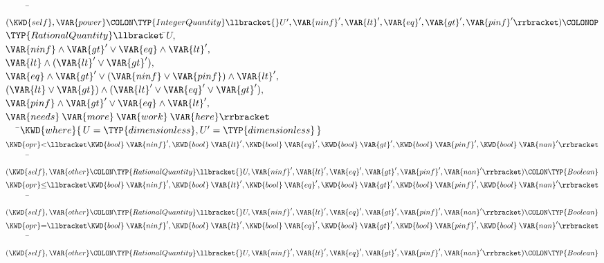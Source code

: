 \begin{Fortress}
{\tt~~~~~}\pushtabs\=\+\(       (\KWD{self}, \VAR{power}\COLON \TYP{IntegerQuantity}\llbracket{}U',\VAR{ninf}',\VAR{lt}',\VAR{eq}',\VAR{gt}',\VAR{pinf}'\rrbracket)\COLONOP\)\\
\(       \TYP{RationalQuantity}\llbracket\,\null\)\pushtabs\=\+\(U,\)\\
\(                         \VAR{ninf} \wedge \VAR{gt}' \vee \VAR{eq} \wedge \VAR{lt}',\)\\
\(                         \VAR{lt} \wedge (\VAR{lt}' \vee \VAR{gt}'),\)\\
\(                         \VAR{eq} \wedge \VAR{gt}' \vee (\VAR{ninf} \vee \VAR{pinf}) \wedge \VAR{lt}',\)\\
\(                         (\VAR{lt} \vee \VAR{gt}) \wedge (\VAR{lt}' \vee \VAR{eq}' \vee \VAR{gt}'),\)\\
\(                         \VAR{pinf} \wedge \VAR{gt}' \vee \VAR{eq} \wedge \VAR{lt}',\)\\
\(                         \VAR{needs}\:\VAR{more}\:\VAR{work}\:\VAR{here}\rrbracket\)\-\-\\\poptabs\poptabs
{\tt~~~}\pushtabs\=\+\(     \KWD{where} \{\,U = \mathbin{\TYP{dimensionless}}, U' = \mathbin{\TYP{dimensionless}}\,\}\)\-\\\poptabs
\(  \KWD{opr} \mathord{<}\llbracket\KWD{bool}\:\VAR{ninf}', \KWD{bool}\:\VAR{lt}', \KWD{bool}\:\VAR{eq}', \KWD{bool}\:\VAR{gt}', \KWD{bool}\:\VAR{pinf}', \KWD{bool}\:\VAR{nan}'\rrbracket\)\\
{\tt~~~~~}\pushtabs\=\+\(       (\KWD{self}, \VAR{other}\COLON \TYP{RationalQuantity}\llbracket{}U,\VAR{ninf}',\VAR{lt}',\VAR{eq}',\VAR{gt}',\VAR{pinf}',\VAR{nan}'\rrbracket)\COLON \TYP{Boolean}\)\-\\\poptabs
\(  \KWD{opr} \mathord{\leq}\llbracket\KWD{bool}\:\VAR{ninf}', \KWD{bool}\:\VAR{lt}', \KWD{bool}\:\VAR{eq}', \KWD{bool}\:\VAR{gt}', \KWD{bool}\:\VAR{pinf}', \KWD{bool}\:\VAR{nan}'\rrbracket\)\\
{\tt~~~~~}\pushtabs\=\+\(       (\KWD{self}, \VAR{other}\COLON \TYP{RationalQuantity}\llbracket{}U,\VAR{ninf}',\VAR{lt}',\VAR{eq}',\VAR{gt}',\VAR{pinf}',\VAR{nan}'\rrbracket)\COLON \TYP{Boolean}\)\-\\\poptabs
\(  \KWD{opr} \mathord{=}\llbracket\KWD{bool}\:\VAR{ninf}', \KWD{bool}\:\VAR{lt}', \KWD{bool}\:\VAR{eq}', \KWD{bool}\:\VAR{gt}', \KWD{bool}\:\VAR{pinf}', \KWD{bool}\:\VAR{nan}'\rrbracket\)\\
{\tt~~~~~}\pushtabs\=\+\(       (\KWD{self}, \VAR{other}\COLON \TYP{RationalQuantity}\llbracket{}U,\VAR{ninf}',\VAR{lt}',\VAR{eq}',\VAR{gt}',\VAR{pinf}',\VAR{nan}'\rrbracket)\COLON \TYP{Boolean}\)\-\\\poptabs

\end{Fortress}
